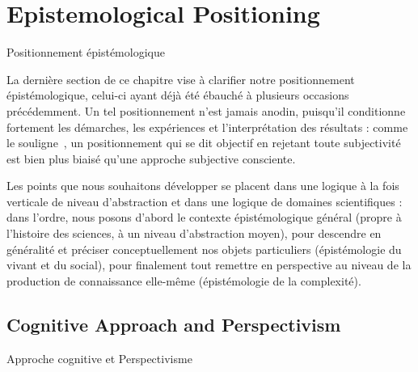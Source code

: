 




\newpage



\section{Epistemological Positioning}{Positionnement épistémologique}\label{sec:epistemology}



La dernière section de ce chapitre vise à clarifier notre positionnement épistémologique, celui-ci ayant déjà été ébauché à plusieurs occasions précédemment. Un tel positionnement n'est jamais anodin, puisqu'il conditionne fortement les démarches, les expériences et l'interprétation des résultats : comme le souligne~\cite{morin1980methode}, un positionnement qui se dit objectif en rejetant toute subjectivité est bien plus biaisé qu'une approche subjective consciente.

Les points que nous souhaitons développer se placent dans une logique à la fois verticale de niveau d'abstraction et dans une logique de domaines scientifiques : dans l'ordre, nous posons d'abord le contexte épistémologique général (propre à l'histoire des sciences, à un niveau d'abstraction moyen), pour descendre en généralité et préciser conceptuellement nos objets particuliers (épistémologie du vivant et du social), pour finalement tout remettre en perspective au niveau de la production de connaissance elle-même (épistémologie de la complexité).




\subsection{Cognitive Approach and Perspectivism}{Approche cognitive et Perspectivisme}



